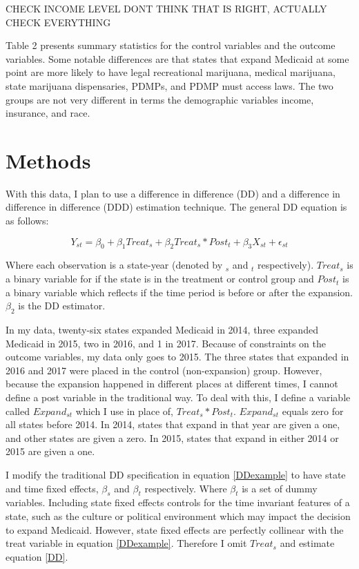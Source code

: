 \documentclass[11pt]{article}
\begin{document}
CHECK INCOME LEVEL DONT THINK THAT IS RIGHT, ACTUALLY CHECK EVERYTHING

Table 2 presents summary statistics for the control variables and the outcome variables.  Some notable differences are that states that expand Medicaid at some point are more likely to have legal recreational marijuana, medical marijuana, state marijuana dispensaries, PDMPs, and PDMP must access laws.  The two groups are not very different in terms the demographic variables income, insurance, and race.  

\section{Methods}
With this data, I plan to use a difference in difference (DD) and a difference in difference in difference (DDD) estimation technique. The general DD equation is as follows:

\begin{equation}
    Y_{st}=\beta_0+\beta_1Treat_s+ \beta_2 Treat_s*Post_t+\beta_3 X_{st} + \epsilon_{st}
     \label{DDexample}
\end{equation}


Where each observation is a state-year (denoted by $_s$ and $_t$ respectively).  $Treat_s$ is a binary variable for if the state is in the treatment or control group and $Post_t$ is a binary variable which reflects if the time period is before or after the expansion.  $\beta_2$ is the DD estimator.  

In my data, twenty-six states expanded Medicaid in 2014, three expanded Medicaid in 2015, two in 2016, and 1 in 2017. Because of constraints on the outcome variables, my data only goes to 2015.  The three states that expanded in 2016 and 2017 were placed in the control (non-expansion) group.  However, because the expansion happened in different places at different times, I cannot define a post variable in the traditional way.  To deal with this, I define a variable called $Expand_{st}$ which I use in place of, $Treat_s*Post_t$.  $Expand_{st}$ equals zero for all states before 2014.  In 2014, states that expand in that year are given a one, and other states are given a zero.  In 2015, states that expand in either 2014 or 2015 are given a one.        


I modify the traditional DD specification in equation \ref{DDexample} to have state and time fixed effects, $\beta_s$ and $\beta_t$ respectively. Where $\beta_t$ is a set of dummy variables.  Including state fixed effects controls for the time invariant features of a state, such as the culture or political environment which may impact the decision to expand Medicaid.  However, state fixed effects are perfectly collinear with the treat variable in equation \ref{DDexample}.  Therefore I omit $Treat_s$ and estimate equation \ref{DD}.
\end{document}
